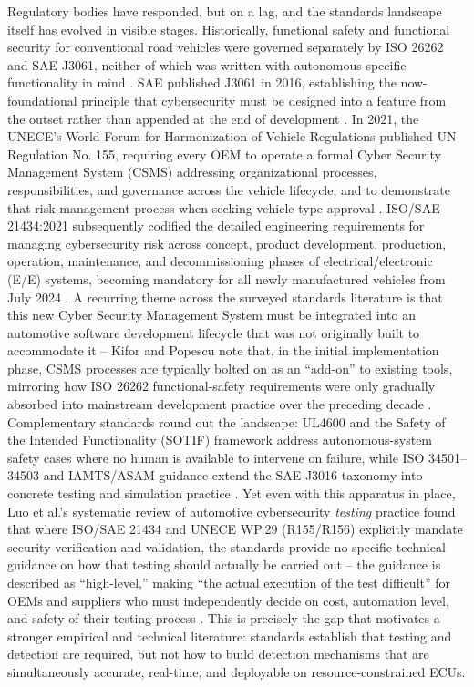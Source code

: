 \documentclass[journal]{IEEEtran}
\begin{document}
	Regulatory bodies have responded, but on a lag, and the standards
	landscape itself has evolved in visible stages. Historically, functional
	safety and functional security for conventional road vehicles were
	governed separately by ISO 26262 and SAE J3061, neither of which was
	written with autonomous-specific functionality in mind \cite{ref1}. SAE
	published J3061 in 2016, establishing the now-foundational principle that
	cybersecurity must be designed into a feature from the outset rather than
	appended at the end of development \cite{ref3}. In 2021, the UNECE's
	World Forum for Harmonization of Vehicle Regulations published UN
	Regulation No. 155, requiring every OEM to operate a formal Cyber
	Security Management System (CSMS) addressing organizational processes,
	responsibilities, and governance across the vehicle lifecycle, and to
	demonstrate that risk-management process when seeking vehicle type
	approval \cite{ref3}. ISO/SAE 21434:2021 subsequently codified the
	detailed engineering requirements for managing cybersecurity risk across
	concept, product development, production, operation, maintenance, and
	decommissioning phases of electrical/electronic (E/E) systems, becoming
	mandatory for all newly manufactured vehicles from July 2024
	\cite{ref3}. A recurring theme across the surveyed standards literature
	is that this new Cyber Security Management System must be integrated
	into an automotive software development lifecycle that was not
	originally built to accommodate it -- Kifor and Popescu note that, in
	the initial implementation phase, CSMS processes are typically bolted on
	as an ``add-on'' to existing tools, mirroring how ISO 26262
	functional-safety requirements were only gradually absorbed into
	mainstream development practice over the preceding decade \cite{ref3}.
	Complementary standards round out the landscape: UL4600 and the Safety
	of the Intended Functionality (SOTIF) framework address autonomous-system
	safety cases where no human is available to intervene on failure, while
	ISO 34501--34503 and IAMTS/ASAM guidance extend the SAE J3016 taxonomy
	into concrete testing and simulation practice \cite{ref1,ref2}. Yet even
	with this apparatus in place, Luo et al.'s systematic review of
	automotive cybersecurity \emph{testing} practice found that where
	ISO/SAE 21434 and UNECE WP.29 (R155/R156) explicitly mandate security
	verification and validation, the standards provide no specific technical
	guidance on how that testing should actually be carried out -- the
	guidance is described as ``high-level,'' making ``the actual execution
	of the test difficult'' for OEMs and suppliers who must independently
	decide on cost, automation level, and safety of their testing process
	\cite{ref5}. This is precisely the gap that motivates a stronger
	empirical and technical literature: standards establish that testing and
	detection are required, but not how to build detection mechanisms that
	are simultaneously accurate, real-time, and deployable on
	resource-constrained ECUs.
	
\end{document}
